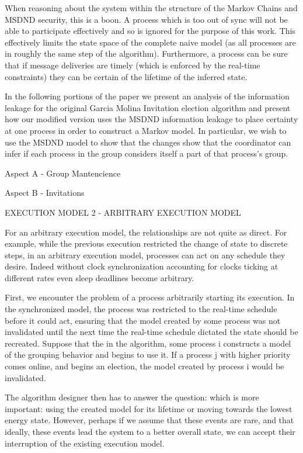 \documentclass[12pt,oneside]{article}
\begin{document}
When reasoning about the system within the structure of the Markov Chains and MSDND security, this is a boon. A process which is too out of sync will not be able to participate effectively and so is ignored for the purpose of this work. This effectively limits the state space of the complete naive model (as all processes are in roughly the same step of the algorithm). Furthermore, a process can be sure that if message deliveries are timely (which is enforced by the real-time constraints) they can be certain of the lifetime of the inferred state.

In the following portions of the paper we present an analysis of the information leakage for the original Garcia Molina Invitation election algorithm and present how our modified version uses the MSDND information leakage to place certainty at one process in order to construct a Markov model. In particular, we wish to use the MSDND model to show that the changes show that the coordinator can infer if each process in the group considers itself a part of that process's group.

Aspect A - Group Mantencience

Aspect B - Invitations

EXECUTION MODEL 2 - ARBITRARY EXECUTION MODEL

For an arbitrary execution model, the relationships are not quite as direct. For example, while the previous execution restricted the change of state to discrete steps, in an arbitrary execution model, processes can act on any schedule they desire. Indeed without clock synchronization accounting for clocks ticking at different rates even sleep deadlines become arbitrary.

First, we encounter the problem of a process arbitrarily starting its execution. In the synchronized model, the process was restricted to the real-time schedule before it could act, ensuring that the model created by some process was not invalidated until the next time the real-time schedule dictated the state should be recreated. Suppose that the in the algorithm,  some process i constructs a model of the grouping behavior and begins to use it. If a process j with higher priority comes online, and begins an election, the model created by process i would be invalidated. 

The algorithm designer then has to answer the question: which is more important: using the created model for its lifetime or moving towards the lowest energy state. However, perhaps if we assume that these events are rare, and that ideally, these events lead the system to a better overall state, we can accept their interruption of the existing execution model.
\end{document}
